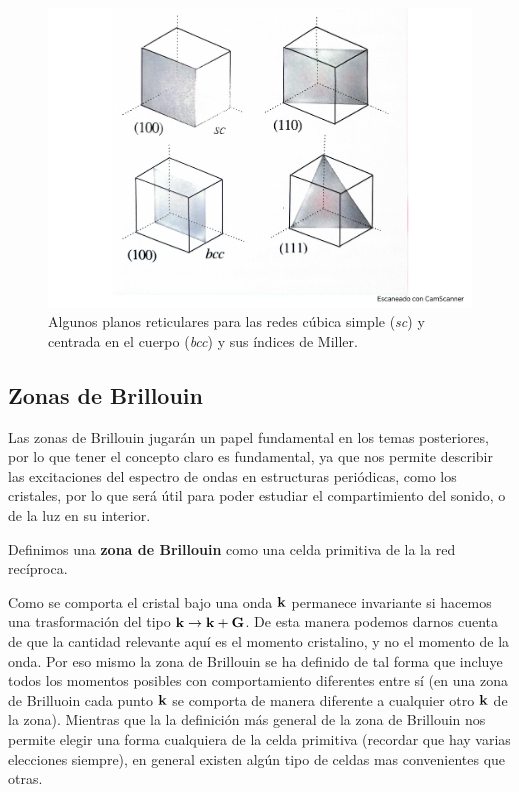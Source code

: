 \begin{figure}[h!] \centering
\includegraphics[scale=0.35]{Cuerpo/Ch_02/Fotos_libro 1.pdf}
\caption{Algunos planos reticulares para las redes cúbica simple (\textit{sc}) y centrada en el cuerpo (\textit{bcc}) y sus índices de Miller.}
\label{Fig:02-01}
\end{figure}

\subsection{Zonas de Brillouin} \label{Subsec:02-01-04}

Las zonas de Brillouin jugarán un papel fundamental en los temas posteriores, por lo que tener el concepto claro es fundamental, ya que nos permite describir las excitaciones del espectro de ondas en estructuras periódicas, como los cristales, por lo que será útil para poder estudiar el compartimiento del sonido, o de la luz en su interior. 

\begin{definition}
	Definimos una \textbf{zona de Brillouin} como una celda primitiva de la la red recíproca.
\end{definition}

Como se comporta el cristal bajo una onda $\mathbf{k}$ permanece invariante si hacemos una trasformación del tipo $\mathbf{k} \rightarrow \mathbf{k} + \mathbf{G}$. De esta manera podemos darnos cuenta de que la cantidad relevante aquí es el momento cristalino, y no el momento de la onda. Por eso mismo la zona de Brillouin se ha definido de tal forma que incluye todos los momentos posibles con comportamiento diferentes entre sí (en una zona de Brilluoin cada punto $\mathbf{k}$ se comporta de manera diferente a cualquier otro $\mathbf{k}$ de la zona). Mientras que la la definición más general de la zona de Brillouin nos permite elegir una forma cualquiera de la celda primitiva (recordar que hay varias elecciones siempre), en general existen algún tipo de celdas mas convenientes que otras. \\

